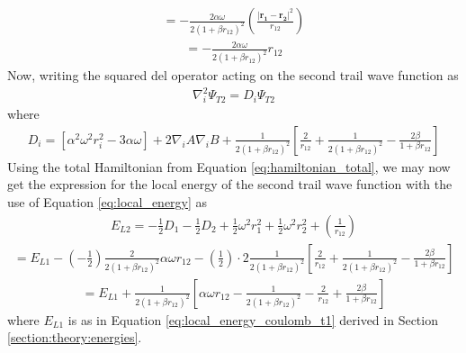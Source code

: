 \documentclass[12pt,english,a4paper]{article}
\begin{document}
\begin{align*}
    = -\frac{2\alpha\omega}{2\left(1+\beta r_{12}\right)^2}\left(\frac{|\boldsymbol{r_1}-\boldsymbol{r_2}|^2}{r_{12}}\right)
\end{align*}
\begin{align*}
    = -\frac{2\alpha\omega}{2\left(1+\beta r_{12}\right)^2}r_{12}
\end{align*}
Now, writing the squared del operator acting on the second trail wave function as
\begin{align*}
    \nabla_i^2 \Psi_{T2}=D_i\Psi_{T2}
\end{align*}
where
\begin{align*}
    D_i=\left[\alpha^2\omega^2 r_i^2-3\alpha\omega\right]+2\nabla_i A\nabla_i B+\frac{1}{2\left(1+\beta r_{12}\right)^2}\left[\frac{2}{r_{12}}+\frac{1}{2\left(1+\beta r_{12}\right)^2}-\frac{2\beta}{1+\beta r_{12}}\right]
\end{align*}
Using the total Hamiltonian from Equation \eqref{eq:hamiltonian_total}, we may now get the expression for the local energy of the second trail wave function with the use of Equation \eqref{eq:local_energy} as
\begin{align*}
    E_{L2}=-\frac{1}{2}D_1-\frac{1}{2}D_2+\frac{1}{2}\omega^2r_1^2+\frac{1}{2}\omega^2r_2^2+\left(\frac{1}{r_{12}}\right)
\end{align*} 
\begin{align*}
    =E_{L1}-\left(-\frac{1}{2}\right)\frac{2}{2\left(1+\beta r_{12}\right)^2}\alpha\omega r_{12}-\left(\frac{1}{2}\right)\cdot 2\frac{1}{2\left(1+\beta r_{12}\right)^2}\left[\frac{2}{r_{12}}+\frac{1}{2\left(1+\beta r_{12}\right)^2}-\frac{2\beta}{1+\beta r_{12}}\right]
\end{align*}
\begin{align*}
    =E_{L1}+\frac{1}{2\left(1+\beta r_{12}\right)^2}\left[\alpha\omega r_{12}-\frac{1}{2\left(1+\beta r_{12}\right)^2}-\frac{2}{r_{12}}+\frac{2\beta}{1+\beta r_{12}}\right]
\end{align*}
where $E_{L1}$ is as in Equation \eqref{eq:local_energy_coulomb_t1} derived in Section \ref{section:theory:energies}.  

\printbibliography
\end{document}
